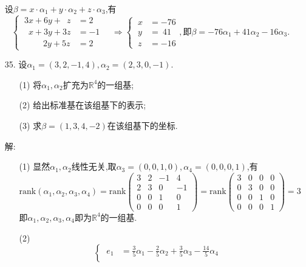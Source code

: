 \documentclass{article}
\begin{document}
\begin{enumerate}
    设$\beta=x\cdot \alpha_1+y\cdot \alpha_2+z\cdot \alpha_3$,有
    \[
        \begin{cases}
            \ 3x+6y+\ \;z & =2\\
            \ \ \;x+3y+3z & =-1\\
            \ \qquad\ 2y+5z & =2
        \end{cases}
        \quad \Rightarrow
        \begin{cases}
            \ x & =-76\\
            \ y & =\ 41\\
            \ z & =-16
        \end{cases}
        ,\mbox{即}\beta=-76\alpha_1+41\alpha_2-16\alpha_3.
    \]
    \item [35.]设$\alpha_1=(3,2,-1,4),\alpha_2=(2,3,0,-1)$.
    \begin{enumerate}
        \item [(1)]将$\alpha_1,\alpha_2$扩充为$\mathbb{R}^4$的一组基;
        \item [(2)]给出标准基在该组基下的表示;
        \item [(3)]求$\beta=(1,3,4,-2)$在该组基下的坐标.
    \end{enumerate}
    解:
    \begin{enumerate}
        \item [(1)]显然$\alpha_1,\alpha_2$线性无关,取$\alpha_3=(0,0,1,0),\alpha_4=(0,0,0,1)$,有
        \[
            \mbox{rank}(\alpha_1,\alpha_2,\alpha_3,\alpha_4)=
            \mbox{rank}\begin{pmatrix}
                3 & 2 & -1 & 4\\
                2 & 3 &  0 & -1\\
                0 & 0 &  1 & 0\\
                0 & 0 &  0 & 1
            \end{pmatrix}
            =\mbox{rank}
            \begin{pmatrix}
                3 & 0 & 0 & 0\\
                0 & 3 & 0 & 0\\
                0 & 0 & 1 & 0\\
                0 & 0 & 0 & 1
            \end{pmatrix}
            =3
        \]
        即$\alpha_1,\alpha_2,\alpha_3,\alpha_4$即为$\mathbb{R}^4$的一组基.
        \item [(2)]
        \[
            \begin{cases}
                \ e_1 & =\displaystyle{\frac{3}{5}\alpha_1-\frac{2}{5}\alpha_2+\frac{3}{5}\alpha_3-\frac{14}{5}\alpha_4}\\

\end{cases}\]
\end{enumerate}
\end{enumerate}
\end{document}

